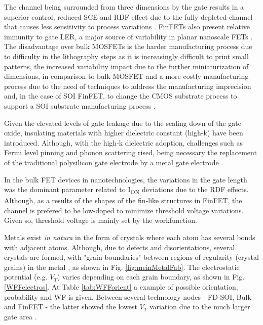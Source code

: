 \documentclass[pgmicro,diss,english]{iiufrgs}
\begin{document}
The channel being surrounded from three dimensions by the gate results in a superior control, reduced SCE and RDF effect due to the fully depleted channel that causes less sensitivity to process variations \cite{taur2013fundamentals}. FinFETs also present relative immunity to gate LER, a major source of variability in planar nanoscale FETs \cite{finfetchar1}. The disadvantage over bulk MOSFETs is the harder manufacturing process due to difficulty in the lithography steps as it is increasingly difficult to print small patterns, the increased variability impact due to the further miniaturization of dimensions, in comparison to bulk MOSFET and a more costly manufacturing process due to the need of techniques to address the manufacturing imprecision and, in the case of SOI FinFET, to change the CMOS substrate process to support a SOI substrate manufacturing process \cite{finfetchar1} \cite{finfetdis}.

Given the elevated levels of gate leakage due to the scaling down of the gate oxide, insulating materials with higher dielectric constant (high-k) have been introduced. Although, with the high-k dielectric adoption, challenges such as Fermi level pinning \cite{hobbs2004fermi} and phonon scattering \cite{gusev2006advanced} rised, being necessary the replacement of the traditional polysilicon gate electrode by a metal gate electrode \cite{gusev2001ultrathin, datta2003high}.

In the bulk FET devices in nanotechnologies, the variations in the gate length was the dominant parameter related to I\textsubscript{ON} deviations due to the RDF effects. Although, as a results of the shapes of the fin-like structures in FinFET, the channel is prefered to be low-doped to minimize threshold voltage variations. Given so, threshold voltage is mainly set by the workfunction.

Metals exist \textit{in natura} in the form of crystals where each atom has several bonds with adjacent atoms. Although, due to defects and disorientations, several crystals are formed, with "grain boundaries" between regions of regularity (crystal grains) in the metal \cite{dadgour2008statistical}, as shown in Fig. \ref{fig:meinMetalFab}. The electrostatic potential (e.g. $V_T$) varies depending on each grain boundary, as shown in Fig. \ref{WFFelectros}. At Table \ref{tab:WFForient} a example of possible orientation, probability and WF is given. Between several technology nodes - FD-SOI, Bulk and FinFET - the latter showed the lowest $V_T$ variation due to the much larger gate area \cite{dadgour2008statistical}.
\end{document}
